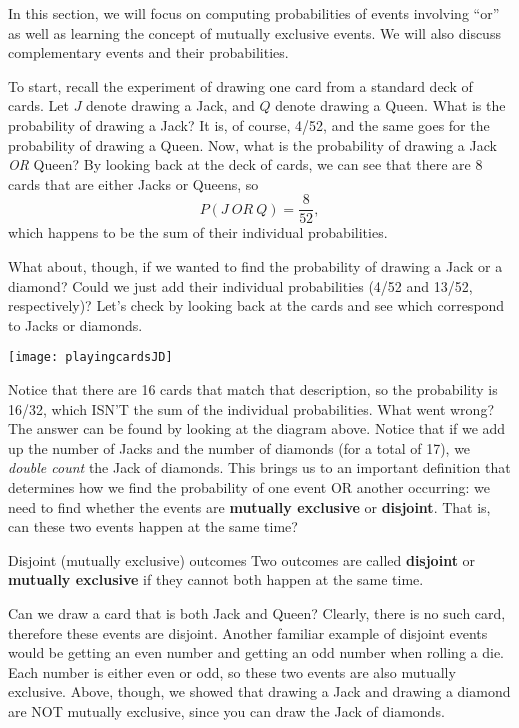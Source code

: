 \setcounter{ExampleCounter}{1}

In this section, we will focus on computing probabilities of events involving ``or'' as well as learning the concept of mutually exclusive events. We will also discuss complementary events and their probabilities. 

To start, recall the experiment of drawing one card from a standard deck of cards. Let $J$ denote drawing a Jack, and $Q$ denote drawing a Queen. What is the probability of drawing a Jack? It is, of course, 4/52, and the same goes for the probability of drawing a Queen. Now, what is the probability of drawing a Jack \emph{OR} Queen?  By looking back at the deck of cards, we can see that there are 8 cards that are either Jacks or Queens, so 
\[P(J \ OR \ Q)=\dfrac{8}{52},\]
which happens to be the sum of their individual probabilities.

What about, though, if we wanted to find the probability of drawing a Jack or a diamond?  Could we just add their individual probabilities (4/52 and 13/52, respectively)?  Let's check by looking back at the cards and see which correspond to Jacks or diamonds.
\begin{center}
\texttt{[image: playingcardsJD]}
\end{center}
Notice that there are 16 cards that match that description, so the probability is 16/32, which ISN'T the sum of the individual probabilities.  What went wrong?\\

The answer can be found by looking at the diagram above.  Notice that if we add up the number of Jacks and the number of diamonds (for a total of 17), we \textit{double count} the Jack of diamonds.  This brings us to an important definition that determines how we find the probability of one event OR another occurring: we need to find whether the events are \textbf{mutually exclusive} or \textbf{disjoint}.  That is, can these two events happen at the same time?
\begin{proc}{Disjoint (mutually exclusive) outcomes}
Two outcomes are called \textbf{disjoint} or \textbf{mutually exclusive} if they cannot both happen at the same time.
\end{proc}
Can we draw a card that is both Jack and Queen? Clearly, there is no such card, therefore these events are disjoint. Another familiar example of disjoint events would be getting an even number and getting an odd number when rolling a die. Each number is either even or odd, so these two events are also mutually exclusive.  Above, though, we showed that drawing a Jack and drawing a diamond are NOT mutually exclusive, since you can draw the Jack of diamonds.

